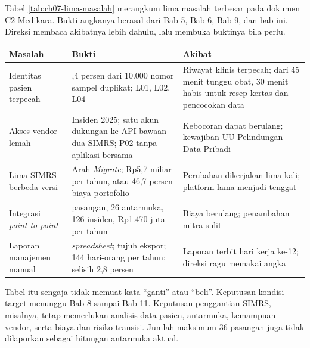 \begin{kasus}[title={Kasus Medikara Health: Lima Masalah Terbesar}]
  Tabel \ref{tab:ch07-lima-masalah} merangkum lima masalah terbesar pada dokumen C2 Medikara. Bukti angkanya berasal dari Bab 5, Bab 6, Bab 9, dan bab ini.
  Direksi membaca akibatnya lebih dahulu, lalu membuka buktinya bila perlu.

  \begin{center}
    \label{tab:ch07-lima-masalah}
    \small
    \begin{tabularx}{\linewidth}{>{\raggedright\arraybackslash}p{2.4cm}>{\raggedright\arraybackslash}X>{\raggedright\arraybackslash}p{3.1cm}}
      \hline
      \textbf{Masalah} & \textbf{Bukti} & \textbf{Akibat} \\
      \hline
      Identitas pasien terpecah & 11,4 persen dari 10.000 nomor sampel duplikat; L01, L02, L04 & Riwayat klinis terpecah; dari 45 menit tunggu obat, 30 menit habis untuk resep kertas dan pencocokan data \\
      \hline
      Akses vendor lemah & Insiden 2025; satu akun dukungan ke API bawaan dua SIMRS; P02 tanpa aplikasi bersama & Kebocoran dapat berulang; kewajiban UU Pelindungan Data Pribadi \\
      \hline
      Lima SIMRS berbeda versi & Arah \textit{Migrate}; Rp5,7 miliar per tahun, atau 46,7 persen biaya portofolio & Perubahan dikerjakan lima kali; platform lama menjadi tenggat \\
      \hline
      Integrasi \textit{point-to-point} & 21 pasangan, 26 antarmuka, 126 insiden, Rp1.470 juta per tahun & Biaya berulang; penambahan mitra sulit \\
      \hline
      Laporan manajemen manual & 23 \textit{spreadsheet}; tujuh ekspor; 144 hari-orang per tahun; selisih 2,8 persen & Laporan terbit hari kerja ke-12; direksi ragu memakai angka \\
      \hline
    \end{tabularx}
  \end{center}

  Tabel itu sengaja tidak memuat kata ``ganti'' atau ``beli''. Keputusan kondisi target menunggu Bab 8 sampai Bab 11. Keputusan penggantian SIMRS, misalnya,
  tetap memerlukan analisis data pasien, antarmuka, kemampuan vendor, serta biaya dan risiko transisi. Jumlah maksimum 36 pasangan juga tidak dilaporkan
  sebagai hitungan antarmuka aktual.
\end{kasus}

